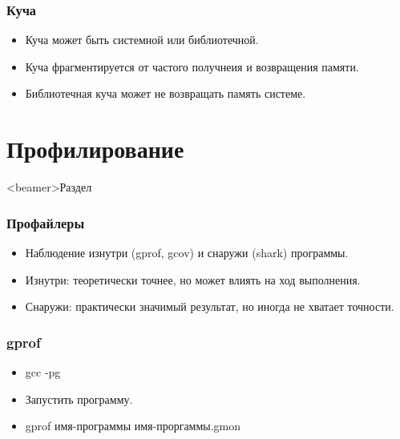 \documentclass[hyperref={unicode=true}]{beamer}
\begin{document}
\begin{frame}
\frametitle{Куча}
\begin{itemize}
\item Куча может быть системной или библиотечной. 
\item Куча фрагментируется от частого получнеия и возвращения
  памяти.
\item Библиотечная куча может не возвращать память системе. 
\end{itemize}
\end{frame}


\section{Профилирование}
  \begin{frame}<beamer>{Раздел}
  \end{frame}


\begin{frame}
\frametitle{Профайлеры}
\begin{itemize}
\item Наблюдение изнутри (gprof, gcov) и снаружи (shark) программы.
\item Изнутри: теоретически точнее, но может влиять на ход выполнения. 
\item Снаружи: практически значимый результат, но иногда не хватает
  точности. 
\end{itemize}
\end{frame}


\begin{frame}
\frametitle{gprof}
\begin{itemize}
\item gcc -pg
\item Запустить программу. 
\item gprof имя-программы имя-проргаммы.gmon
\end{itemize}
\end{frame}
\end{document}
